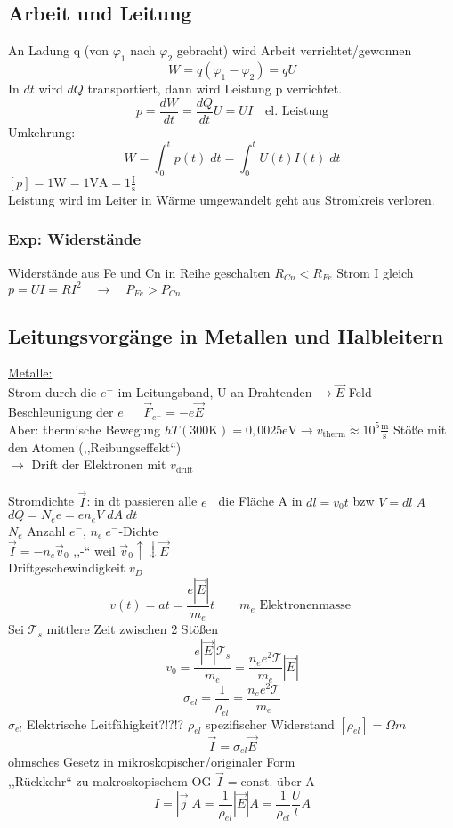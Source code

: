 \documentclass[titlepage,12pt,a4paper,ngerman]{report}
\newcommand{\tx}[1]{\textrm{#1}}
\begin{document}
\subsection{Arbeit und Leitung}
An Ladung q (von $\varphi_1$ nach $\varphi_2$ gebracht) wird Arbeit verrichtet/gewonnen
$$W = q(\varphi_1 - \varphi_2) = q U$$
In $dt$ wird $dQ$ transportiert, dann wird Leistung p verrichtet.
$$\boxed{p = \frac{dW}{dt} = \frac{dQ}{dt} U = U I} \quad \tx{el. Leistung} $$
Umkehrung: $$W = \int_0^t p(t) \; dt = \int_0^t U(t) I(t) \; dt$$
$[p] = 1 \tx{W} = 1 \tx{VA} = 1 \frac{\tx{I}}{\tx{s}}$\\
Leistung wird im Leiter in Wärme umgewandelt geht aus Stromkreis verloren.
\subsubsection{Exp: Widerstände}
Widerstände aus Fe und Cn in Reihe geschalten $R_{Cn} < R_{Fe}$ Strom I gleich \\
$p = UI = R I^2 \quad \rightarrow \quad P_{Fe} > P_{Cn}$


\subsection{Leitungsvorgänge in Metallen und Halbleitern}
\underline{Metalle:} \\
Strom durch die $ e^- $ im Leitungsband, U an Drahtenden $ \rightarrow  \vec{E}$-Feld\\
Beschleunigung der $ e^- \quad \vec{F}_{e^-} = - e \vec{E}$\\
Aber: thermische Bewegung $hT(300\tx{K})= 0,0025 \tx{eV} \rightarrow v_{\tx{therm}} \approx 10^5 \frac{\tx{m}}{\tx{s}}$
Stöße mit den Atomen (,,Reibungseffekt``)\\
$\rightarrow$ Drift der Elektronen mit $ v_{\tx{drift}} $\\\\
Stromdichte $ \vec{I} $: in dt passieren alle $ e^- $ die Fläche A in $dl = v_0 t$ bzw $ V = dl\;A $\\
$dQ = N_e e = e n_e V \;dA\;dt$ \\
$N_e$ Anzahl $e^-$, $n_e \ e^- $-Dichte\\
$\boxed{\vec{I} = - n_e \vec{v}_0}$ ,,-`` weil $ \vec{v}_0 \uparrow \downarrow \vec{E} $\\
Driftgeschewindigkeit $v_D$ 
$$v(t) = a t = \frac{e|\vec{E}|}{m_e} t \qquad m_e \tx{ Elektronenmasse }$$
Sei $ \mathcal{T}_s $ mittlere Zeit zwischen 2 Stößen
$$v_0 = \frac{e|\vec{E}| \mathcal{T}_s}{m_e} = \boxed{\frac{n_e e^2 \mathcal{T}}{m_e}} |\vec{E}|$$
$$\boxed{\sigma_{el} = \frac{1}{\rho_{el}} = \frac{n_e e^2 \mathcal{T}}{m_e}}$$
$ \sigma_{el} $ Elektrische Leitfähigkeit?!?!? $ \rho_{el} $ spezifischer Widerstand $ [\rho_{el} ] = \Omega m $
$$\boxed{\vec{I} = \sigma_{el} \vec{E}}$$
ohmsches Gesetz in mikroskopischer/originaler Form\\
,,Rückkehr`` zu makroskopischem OG $ \vec{I} = \tx{const.} $ über A
$$I = |\vec{j}| A = \frac{1}{\rho_{el}} |\vec{E}| A = \frac{1}{\rho_{el}} \frac{U}{l} A$$
\end{document}
